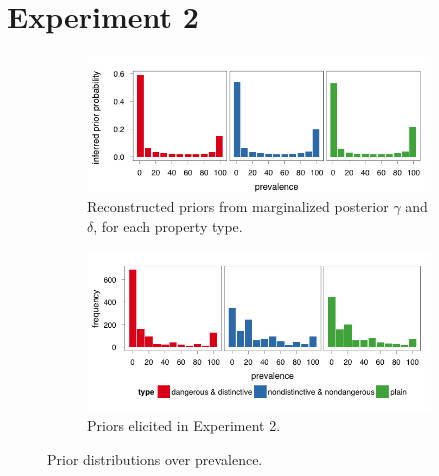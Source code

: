 \documentclass[10pt,letterpaper]{article}
\begin{document}
\section{Experiment 2}

\begin{figure}
        \centering
        \begin{subfigure}[b]{0.9\columnwidth}
    			\includegraphics[width=0.9\columnwidth]{inferred_marginalized_priors1}
                \caption{Reconstructed priors from marginalized posterior $\gamma$ and $\delta$, for each property type.}
                \label{fig:inferredpriors}
        \end{subfigure}%
        
        
        \begin{subfigure}[b]{0.9\columnwidth}
                \includegraphics[width=0.9\columnwidth]{exp2_elicited_combined}
                \caption{Priors elicited in Experiment 2.}
                \label{fig:elicitedpriors}
        \end{subfigure}
        \caption{Prior distributions over prevalence.}\label{fig:priors}
\end{figure}
\end{document}
